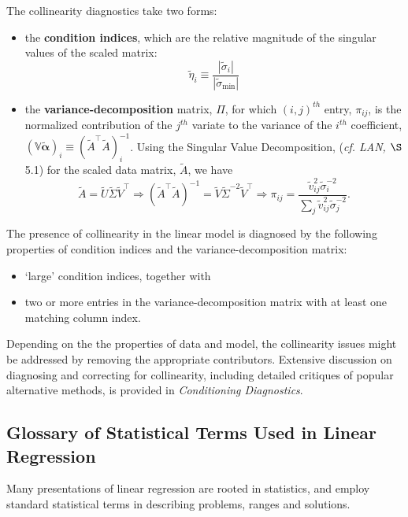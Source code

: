 \documentclass[12pt, twoside, draft]{article}
\begin{document}
The collinearity diagnostics take two forms:
\begin{itemize}[noitemsep]
\item the \textbf{condition indices}, which are the relative magnitude of the singular values of the scaled matrix:
\begin{equation}
\tilde{\eta}_i \equiv \frac{|\tilde{\sigma}_i|}{|\tilde{\sigma}_{\operatorname{min}}|}
\end{equation}
\item the \textbf{variance-decomposition} matrix, $\Pi$,  for which $(i,j)^{th}$ entry, $\pi_{ij}$, is the normalized contribution of the $j^{th}$ variate to the variance of the $i^{th}$ coefficient, $(\mathbb{V} \tilde{\boldsymbol{\alpha}})_i \equiv (\tilde{A}^\top \tilde{A})^{-1}_i$.  Using the Singular Value Decomposition, (\textit{cf. LAN,} $\S$5.1) for the scaled data matrix, $\tilde{A}$, we have
\begin{equation}
\tilde{A} = \tilde{U} \tilde{\Sigma} \tilde{V}^\top \Rightarrow (\tilde{A}^\top \tilde{A})^{-1} = \tilde{V} \tilde{\Sigma}^{-2} \tilde{V}^\top \Rightarrow \pi_{ij} = \frac{\tilde{v}_{ij}^2 \tilde{\sigma}_i^{-2}}{\sum_{j} \tilde{v}_{ij}^2 \tilde{\sigma}_j^{-2}}.
\end{equation}
\end{itemize}

The presence of collinearity in the linear model is diagnosed by the following properties of condition indices and the variance-decomposition matrix:
\begin{itemize}[noitemsep]
\item `large' condition indices, together with
\item two or more entries in the variance-decomposition matrix with at least one matching column index.
\end{itemize}

Depending on the the properties of data and model, the collinearity issues might be addressed by removing the appropriate contributors.  Extensive discussion on diagnosing and correcting for collinearity, including detailed critiques of popular alternative methods, is provided in \textit{Conditioning Diagnostics}.


\subsection{Glossary of Statistical Terms Used in Linear Regression}
Many presentations of linear regression are rooted in statistics, and employ standard statistical terms in describing problems, ranges and solutions.
\end{document}
